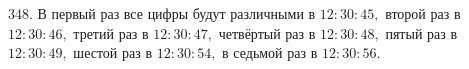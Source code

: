 348. В первый раз все цифры будут различными в $12:30:45,$ второй раз в $12:30:46,$ третий раз в $12:30:47,$ четвёртый раз в $12:30:48,$ пятый раз в $12:30:49,$ шестой раз в $12:30:54,$ в седьмой раз в $12:30:56.$\\
